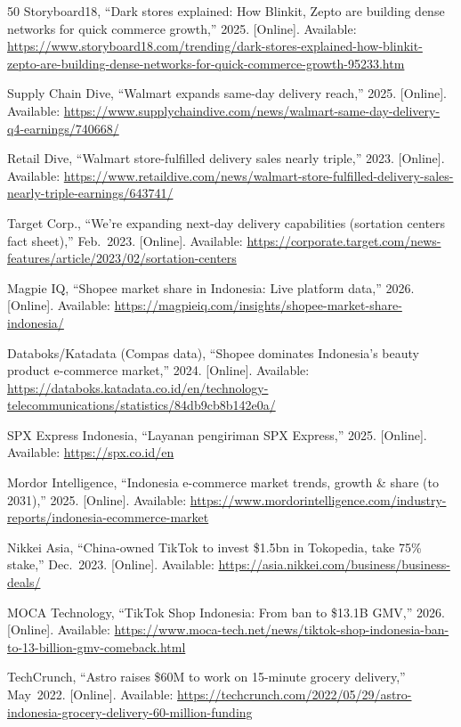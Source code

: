 \documentclass[journal]{IEEEtran}
\begin{document}
\begin{thebibliography}{50}
 Storyboard18, ``Dark stores explained: How Blinkit, Zepto are building dense networks for quick commerce growth,'' 2025. [Online]. Available: \url{https://www.storyboard18.com/trending/dark-stores-explained-how-blinkit-zepto-are-building-dense-networks-for-quick-commerce-growth-95233.htm}

 Supply Chain Dive, ``Walmart expands same-day delivery reach,'' 2025. [Online]. Available: \url{https://www.supplychaindive.com/news/walmart-same-day-delivery-q4-earnings/740668/}

 Retail Dive, ``Walmart store-fulfilled delivery sales nearly triple,'' 2023. [Online]. Available: \url{https://www.retaildive.com/news/walmart-store-fulfilled-delivery-sales-nearly-triple-earnings/643741/}

 Target Corp., ``We're expanding next-day delivery capabilities (sortation centers fact sheet),'' Feb.~2023. [Online]. Available: \url{https://corporate.target.com/news-features/article/2023/02/sortation-centers}

 Magpie IQ, ``Shopee market share in Indonesia: Live platform data,'' 2026. [Online]. Available: \url{https://magpieiq.com/insights/shopee-market-share-indonesia/}

 Databoks/Katadata (Compas data), ``Shopee dominates Indonesia's beauty product e-commerce market,'' 2024. [Online]. Available: \url{https://databoks.katadata.co.id/en/technology-telecommunications/statistics/84db9cb8b142e0a/}

 SPX Express Indonesia, ``Layanan pengiriman SPX Express,'' 2025. [Online]. Available: \url{https://spx.co.id/en}

 Mordor Intelligence, ``Indonesia e-commerce market trends, growth \& share (to 2031),'' 2025. [Online]. Available: \url{https://www.mordorintelligence.com/industry-reports/indonesia-ecommerce-market}

 Nikkei Asia, ``China-owned TikTok to invest \$1.5bn in Tokopedia, take 75\% stake,'' Dec.~2023. [Online]. Available: \url{https://asia.nikkei.com/business/business-deals/}

 MOCA Technology, ``TikTok Shop Indonesia: From ban to \$13.1B GMV,'' 2026. [Online]. Available: \url{https://www.moca-tech.net/news/tiktok-shop-indonesia-ban-to-13-billion-gmv-comeback.html}

 TechCrunch, ``Astro raises \$60M to work on 15-minute grocery delivery,'' May~2022. [Online]. Available: \url{https://techcrunch.com/2022/05/29/astro-indonesia-grocery-delivery-60-million-funding}


\end{thebibliography}
\end{document}
